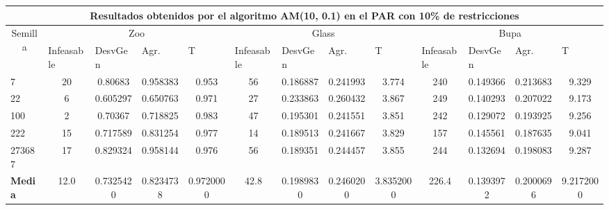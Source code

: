 \begin{table}[H]
	\tiny

	\begin{adjustwidth}{-1cm}{-1cm}%
	
	\begin{tabular}{|l|c|c|c|c|c|c|c|c|c|c|c|c|}
	\hline
	\multicolumn{13}{|c|}{\textbf{Resultados obtenidos por el algoritmo AM(10, 0.1) en el PAR con 10\% de restricciones}}                                                                                                                                                                                                                                                                                                                                            \\ \hline
	\multicolumn{1}{|c|}{\multirow{2}{*}{Semilla}} & \multicolumn{4}{c|}{Zoo}                                                                                          & \multicolumn{4}{c|}{Glass}                                                                                         & \multicolumn{4}{c|}{Bupa}                                                                                          \\ \cline{2-13} 
	\multicolumn{1}{|c|}{}                                  & \multicolumn{1}{l|}{Infeasable} & \multicolumn{1}{l|}{DesvGen} & \multicolumn{1}{l|}{Agr.} & \multicolumn{1}{l|}{T} & \multicolumn{1}{l|}{Infeasable} & \multicolumn{1}{l|}{DesvGen} & \multicolumn{1}{l|}{Agr.} & \multicolumn{1}{l|}{T} & \multicolumn{1}{l|}{Infeasable} & \multicolumn{1}{l|}{DesvGen} & \multicolumn{1}{l|}{Agr.} & \multicolumn{1}{l|}{T} \\ \hline
	7   	& 20 & 0.80683 & 0.958383 & 0.953 &				56 & 0.186887 & 0.241993 & 3.774 &			 	240 & 0.149366 & 0.213683 & 9.329		\\ \hline
	22 		& 6 & 0.605297 & 0.650763 & 0.971 &				27 & 0.233863 & 0.260432 & 3.867 &		 	249 & 0.140293 & 0.207022 & 9.173		\\ \hline
	100 	& 2 & 0.70367 & 0.718825 & 0.983 &				47 & 0.195301 & 0.241551 & 3.851 &				242 & 0.129072 & 0.193925 & 9.256		\\ \hline
	222 	& 15 & 0.717589 & 0.831254 & 0.977 &				14 & 0.189513 & 0.241667 & 3.829 & 			157 & 0.145561 & 0.187635 & 9.041		\\ \hline
	273687 	& 17 & 0.829324 & 0.958144 & 0.976 &				56 & 0.189351 & 0.244457 & 3.855 &			244 & 0.132694 & 0.198083 & 9.287		\\ \hline
	\textbf{Media} &  12.0 & 	0.7325420 & 	0.8234738 & 	0.9720000 & 	42.8 & 	0.1989830 & 	0.2460200 & 	3.8352000 & 	226.4 & 	0.1393972 & 	0.2000696 & 	9.2172000  \\ \hline
	\end{tabular}
	
	\end{adjustwidth}
	
\end{table}

